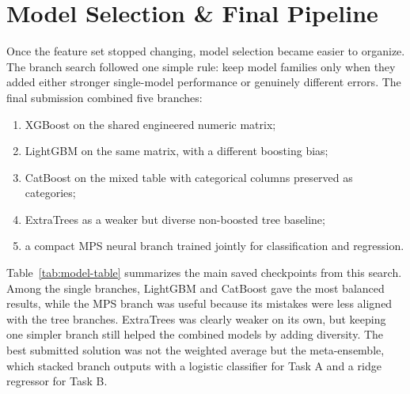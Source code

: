 \section{Model Selection \& Final Pipeline}

Once the feature set stopped changing, model selection became easier to organize. The branch search followed one simple rule: keep model families only when they added either stronger single-model performance or genuinely different errors. The final submission combined five branches:
\begin{enumerate}
    \item XGBoost on the shared engineered numeric matrix;
    \item LightGBM on the same matrix, with a different boosting bias;
    \item CatBoost on the mixed table with categorical columns preserved as categories;
    \item ExtraTrees as a weaker but diverse non-boosted tree baseline;
    \item a compact MPS neural branch trained jointly for classification and regression.
\end{enumerate}

Table~\ref{tab:model-table} summarizes the main saved checkpoints from this search. Among the single branches, LightGBM and CatBoost gave the most balanced results, while the MPS branch was useful because its mistakes were less aligned with the tree branches. ExtraTrees was clearly weaker on its own, but keeping one simpler branch still helped the combined models by adding diversity. The best submitted solution was not the weighted average but the meta-ensemble, which stacked branch outputs with a logistic classifier for Task A and a ridge regressor for Task B.

